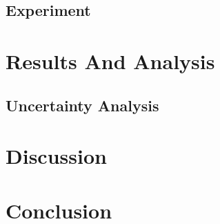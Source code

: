 \documentclass[a4paper,12pt]{article}
\begin{document}
    \subsection{Experiment}


\section{Results And Analysis}%
    \subsection{Uncertainty Analysis}

\section{Discussion}%

\section{Conclusion}%

\pagebreak
{}
\printbibliography
\end{document}
